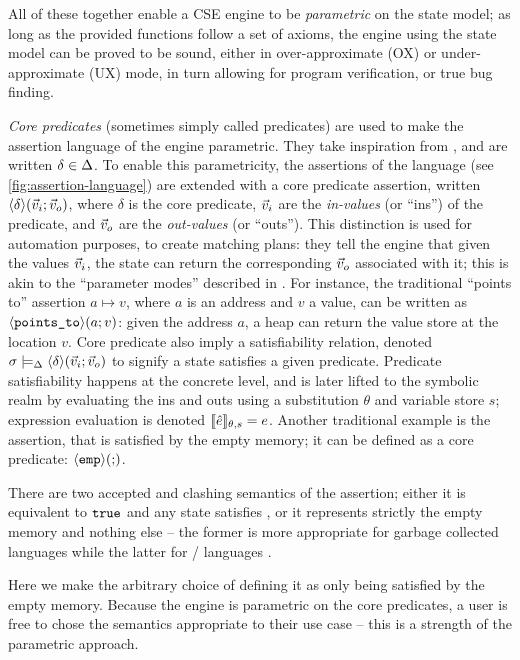 All of these together enable a CSE engine to be \emph{parametric} on the state model; as long as the provided functions follow a set of axioms, the engine using the state model can be proved to be sound, either in over-approximate (OX) or under-approximate (UX) mode, in turn allowing for program verification, or true bug finding.

\emph{Core predicates} (sometimes simply called predicates) are used to make the assertion language of the engine parametric. They take inspiration from \cite{abstractseplogic}, and are written ${\delta\in\Delta}$. To enable this parametricity, the assertions of the language (see \autoref{fig:assertion-language}) are extended with a core predicate assertion, written $\left<\delta\right>\!(\vec{v}_i;\vec{v}_o)$, where $\delta$ is the core predicate, $\vec{v}_i$ are the \emph{in-values} (or ``ins'') of the predicate, and $\vec{v}_o$ are the \emph{out-values} (or ``outs''). This distinction is used for automation purposes, to create matching plans: they tell the engine that given the values $\vec{v}_i$, the state can return the corresponding $\vec{v}_o$ associated with it; this is akin to the ``parameter modes'' described in \cite{parametermodes}. For instance, the traditional ``points to'' assertion $a \mapsto v$, where $a$ is an address and $v$ a value, can be written as $\left<\texttt{points\_to}\right>\!(a;v)$: given the address $a$, a heap can return the value store at the location $v$. Core predicate also imply a satisfiability relation, denoted $\sigma\models_{\Delta}\left<\delta\right>\!(\vec{v}_i;\vec{v}_o)$ to signify a state satisfies a given predicate. Predicate satisfiability happens at the concrete level, and is later lifted to the symbolic realm by evaluating the ins and outs using a substitution $\theta$ and variable store $s$; expression evaluation is denoted $\llbracket\hat{e}\rrbracket_{\theta,s}=e$. Another traditional example is the \emp{} assertion, that is satisfied by the empty memory; it can be defined as a core predicate: $\left<\texttt{emp}\right>\!(;\!)$.

\begin{remark}
There are two accepted and clashing semantics of the \emp{} assertion; either it is equivalent to $\texttt{true}$ and any state satisfies \emp{}, or it represents strictly the empty memory and nothing else -- the former is more appropriate for garbage collected languages while the latter for \alloc/\free{} languages \cite{sljungle}.

Here we make the arbitrary choice of defining it as only being satisfied by the empty memory. Because the engine is parametric on the core predicates, a user is free to chose the semantics appropriate to their use case -- this is a strength of the parametric approach.
\end{remark}

